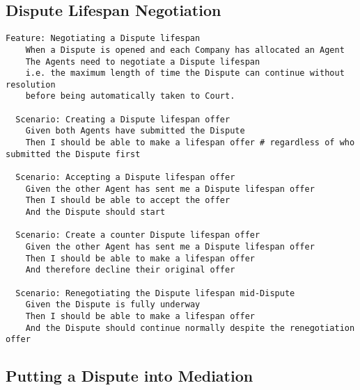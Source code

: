 \subsection{Dispute Lifespan Negotiation}

\begin{lstlisting}
Feature: Negotiating a Dispute lifespan
    When a Dispute is opened and each Company has allocated an Agent
    The Agents need to negotiate a Dispute lifespan
    i.e. the maximum length of time the Dispute can continue without resolution 
    before being automatically taken to Court.

  Scenario: Creating a Dispute lifespan offer
    Given both Agents have submitted the Dispute
    Then I should be able to make a lifespan offer # regardless of who submitted the Dispute first

  Scenario: Accepting a Dispute lifespan offer
    Given the other Agent has sent me a Dispute lifespan offer
    Then I should be able to accept the offer
    And the Dispute should start

  Scenario: Create a counter Dispute lifespan offer
    Given the other Agent has sent me a Dispute lifespan offer
    Then I should be able to make a lifespan offer
    And therefore decline their original offer

  Scenario: Renegotiating the Dispute lifespan mid-Dispute
    Given the Dispute is fully underway
    Then I should be able to make a lifespan offer
    And the Dispute should continue normally despite the renegotiation offer
\end{lstlisting}

\subsection{Putting a Dispute into Mediation}

